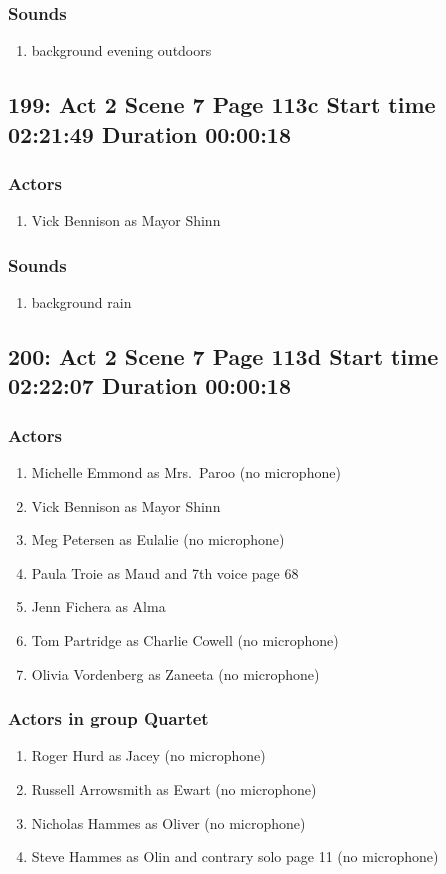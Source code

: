 \subsubsection{Sounds}
\begin{enumerate}
\item background evening outdoors
\end{enumerate}
\subsection{199: Act 2 Scene 7 Page 113c Start time 02:21:49 Duration 00:00:18}

\subsubsection{Actors}
\begin{enumerate}
\item Vick Bennison as Mayor Shinn
\end{enumerate}

\subsubsection{Sounds}
\begin{enumerate}
\item background rain
\end{enumerate}
\subsection{200: Act 2 Scene 7 Page 113d Start time 02:22:07 Duration 00:00:18}

\subsubsection{Actors}
\begin{enumerate}
\item Michelle Emmond as Mrs.~Paroo (no microphone)
\item Vick Bennison as Mayor Shinn
\item Meg Petersen as Eulalie (no microphone)
\item Paula Troie as Maud and 7th voice page 68
\item Jenn Fichera as Alma
\item Tom Partridge as Charlie Cowell (no microphone)
\item Olivia Vordenberg as Zaneeta (no microphone)
\end{enumerate}
\subsubsection{Actors in group Quartet}
\begin{enumerate}
\item Roger Hurd as Jacey (no microphone)
\item Russell Arrowsmith as Ewart (no microphone)
\item Nicholas Hammes as Oliver (no microphone)
\item Steve Hammes as Olin and contrary solo page 11 (no microphone)
\end{enumerate}
